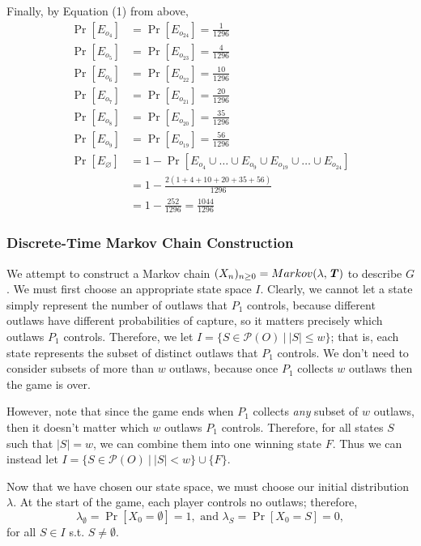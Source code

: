 \documentclass{article}
\newcommand{\T}{\textbf{\textit{T}}}
\theoremstyle{definition}
\theoremstyle{plain}
\begin{document}
	Finally, by Equation (1) from above,
	\begin{align*}
	\Pr[E_{o_4}] &= \Pr[E_{o_{24}}] = \tfrac{1}{1296}\\
	\Pr[E_{o_5}] &= \Pr[E_{o_{23}}] = \tfrac{4}{1296}\\
	\Pr[E_{o_6}] &= \Pr[E_{o_{22}}] = \tfrac{10}{1296}\\
	\Pr[E_{o_7}] &= \Pr[E_{o_{21}}] = \tfrac{20}{1296}\\
	\Pr[E_{o_8}] &= \Pr[E_{o_{20}}] = \tfrac{35}{1296}\\
	\Pr[E_{o_9}] &= \Pr[E_{o_{19}}] = \tfrac{56}{1296}\\
	\Pr[E_\varnothing] &= 1 - \Pr[E_{o_4} \cup \dots \cup E_{o_9} \cup E_{o_{19}} \cup \dots \cup E_{o_{24}}]\\
		&= 1 - \frac{2(1 + 4 + 10 + 20 + 35 + 56)}{1296}\\
		&= 1 - \frac{252}{1296} = \frac{1044}{1296}
	\end{align*}

	\subsubsection{Discrete-Time Markov Chain Construction}
We attempt to construct a Markov chain $(X_n)_{n \geq 0} = Markov(\lambda, \T)$ to describe $G$. We must first choose an appropriate state space $I$. Clearly, we cannot let a state simply represent the number of outlaws that $P_1$ controls, because different outlaws have different probabilities of capture, so it matters precisely which outlaws $P_1$ controls.  Therefore, we let $I = \{S \in \mathcal{P}(O) ~\big|~ |S| \leq w\}$; that is, each state represents the subset of distinct outlaws that $P_1$ controls. We don't need to consider subsets of more than $w$ outlaws, because once $P_1$ collects $w$ outlaws then the game is over.

	However, note that since the game ends when $P_1$ collects \textit{any} subset of $w$ outlaws, then it doesn't matter which $w$ outlaws $P_1$ controls. Therefore, for all states $S$ such that $|S| = w$, we can combine them into one winning state $F$. Thus we can instead let $I = \{S \in \mathcal{P}(O) ~\big|~ |S| < w\} \cup \{F\}$.

	Now that we have chosen our state space, we must choose our initial distribution $\lambda$. At the start of the game, each player controls no outlaws; therefore, \[\lambda_\emptyset = \Pr[X_0 = \emptyset] = 1, \text{ and }\lambda_S = \Pr[X_0 = S] = 0,\] for all $S \in I$ s.t. $S \neq \emptyset$.
\end{document}
